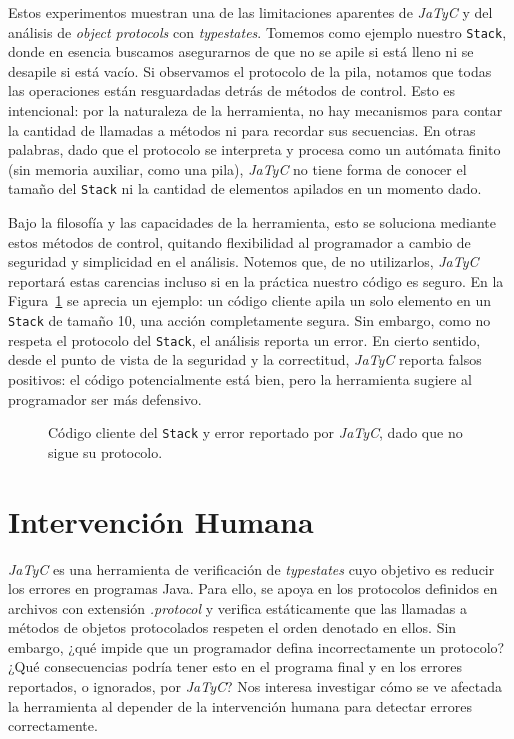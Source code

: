 Estos experimentos muestran una de las limitaciones aparentes de \textit{JaTyC} y del análisis de \textit{object protocols} con \textit{typestates}. Tomemos como ejemplo nuestro \texttt{Stack}, donde en esencia buscamos asegurarnos de que no se apile si está lleno ni se desapile si está vacío. Si observamos el protocolo de la pila, notamos que todas las operaciones están resguardadas detrás de métodos de control. Esto es intencional: por la naturaleza de la herramienta, no hay mecanismos para contar la cantidad de llamadas a métodos ni para recordar sus secuencias. En otras palabras, dado que el protocolo se interpreta y procesa como un autómata finito (sin memoria auxiliar, como una pila), \textit{JaTyC} no tiene forma de conocer el tamaño del \texttt{Stack} ni la cantidad de elementos apilados en un momento dado.

Bajo la filosofía y las capacidades de la herramienta, esto se soluciona mediante estos métodos de control, quitando flexibilidad al programador a cambio de seguridad y simplicidad en el análisis. Notemos que, de no utilizarlos, \textit{JaTyC} reportará estas carencias incluso si en la práctica nuestro código es seguro. En la Figura~\ref{exp:normal-stack:client} se aprecia un ejemplo: un código cliente apila un solo elemento en un \texttt{Stack} de tamaño 10, una acción completamente segura. Sin embargo, como no respeta el protocolo del \texttt{Stack}, el análisis reporta un error. En cierto sentido, desde el punto de vista de la seguridad y la correctitud, \textit{JaTyC} reporta falsos positivos: el código potencialmente está bien, pero la herramienta sugiere al programador ser más defensivo.

\begin{figure}[htbp]
    \centering
    
    \vspace{0.3cm}
    
    \caption{Código cliente del \texttt{Stack} y error reportado por \textit{JaTyC}, dado que no sigue su protocolo.}
    \label{exp:normal-stack:client}
\end{figure}

\section{Intervención Humana}

\textit{JaTyC} es una herramienta de verificación de \textit{typestates} cuyo objetivo es reducir los errores en programas Java. Para ello, se apoya en los protocolos definidos en archivos con extensión \textit{.protocol} y verifica estáticamente que las llamadas a métodos de objetos protocolados respeten el orden denotado en ellos. Sin embargo, ¿qué impide que un programador defina incorrectamente un protocolo? ¿Qué consecuencias podría tener esto en el programa final y en los errores reportados, o ignorados, por \textit{JaTyC}? Nos interesa investigar cómo se ve afectada la herramienta al depender de la intervención humana para detectar errores correctamente.

